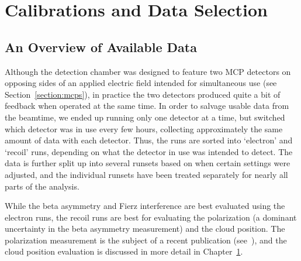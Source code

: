 %
%
%
\clearpage
\chapter{Calibrations and Data Selection}
\label{calibrations_chapter}
\label{dataselection_chapter}
\section{An Overview of Available Data}
\label{sec:data_overview}


Although the detection chamber was designed to feature two MCP detectors on opposing sides of an applied electric field intended for simultaneous use (see Section~\ref{section:mcps}), in practice the two detectors produced quite a bit of feedback when operated at the same time.  In order to salvage usable data from the beamtime, we ended up running only one detector at a time, but switched which detector was in use every few hours, collecting approximately the same amount of data with each detector.  Thus, the runs are sorted into `electron' and `recoil' runs, depending on what the detector in use was intended to detect.  The data is further split up into several runsets based on when certain settings were adjusted, and the individual runsets have been treated separately for nearly all parts of the analysis.

While the beta asymmetry and Fierz interference are best evaluated using the electron runs, the recoil runs are best for evaluating the polarization (a dominant uncertainty in the beta asymmetry measurement) and the cloud position.  The polarization measurement is the subject of a recent publication (see~\cite{ben_OP}), and the cloud position evaluation is discussed in more detail in Chapter~\ref{calibrations_chapter}.

